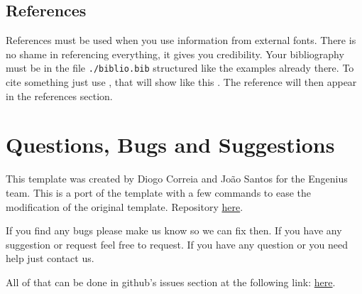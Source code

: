 \subsection{References}

References must be used when you use information from external fonts. There is no shame in referencing everything, it gives you credibility. Your bibliography must be in the file \texttt{./biblio.bib} structured like the examples already there. To cite something just use \texttt{\cite{name}}, that will show like this \cite{einstein}. The reference will then appear in the references section.

\section{Questions, Bugs and Suggestions}

This template was created by Diogo Correia and João Santos for the Engenius team. This is a port of the template with a few commands to ease the modification of the original template.
Repository \textcolor{blue}{\href{https://https://github.com/dvcorreia/magda-latex-report}{here}}.

If you find any bugs please make us know so we can fix then.
If you have any suggestion or request feel free to request.
If you have any question or you need help just contact us.

All of that can be done in github's issues section at the following link:  \textcolor{blue}{\href{https://github.com/dvcorreia/magda-latex-report/issues/new}{here}}.